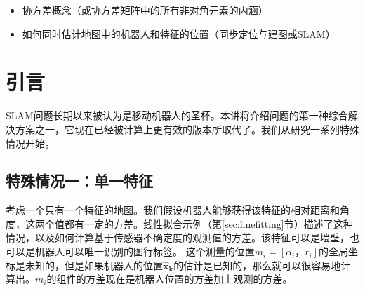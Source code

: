 \begin{itemize}
\item 协方差概念（或协方差矩阵中的所有非对角元素的内涵）
\item 如何同时估计地图中的机器人和特征的位置（同步定位与建图或SLAM）
\end{itemize}



\section{引言}

SLAM问题长期以来被认为是移动机器人的圣杯。本讲将介绍问题的第一种综合解决方案之一，它现在已经被计算上更有效的版本所取代了。我们从研究一系列特殊情况开始。


\subsection{特殊情况一：单一特征}

考虑一个只有一个特征的地图。我们假设机器人能够获得该特征的相对距离和角度，这两个值都有一定的方差。线性拟合示例（第\ref{sec:linefitting}节）描述了这种情况，以及如何计算基于传感器不确定度的观测值的方差。该特征可以是墙壁，也可以是机器人可以唯一识别的图行标签。 这个测量的位置$m_i = [\alpha_i，r_i]$的全局坐标是未知的，但是如果机器人的位置$\boldsymbol {\hat{x}_k}$的估计是已知的，那么就可以很容易地计算出。$m_i$的组件的方差现在是机器人位置的方差加上观测的方差。

